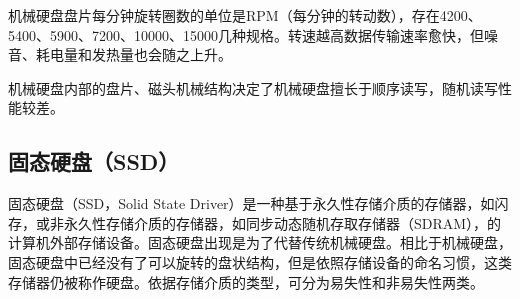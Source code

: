 机械硬盘盘片每分钟旋转圈数的单位是RPM（每分钟的转动数），存在4200、5400、5900、7200、10000、15000几种规格。转速越高数据传输速率愈快，但噪音、耗电量和发热量也会随之上升。

机械硬盘内部的盘片、磁头机械结构决定了机械硬盘擅长于顺序读写，随机读写性能较差。

\subsection{固态硬盘（SSD）}
固态硬盘\cite{ssd2009}（SSD，Solid State Driver）是一种基于永久性存储介质的存储器，如闪存，或非永久性存储介质的存储器，如同步动态随机存取存储器（SDRAM），的计算机外部存储设备。固态硬盘出现是为了代替传统机械硬盘。相比于机械硬盘，固态硬盘中已经没有了可以旋转的盘状结构，但是依照存储设备的命名习惯，这类存储器仍被称作硬盘。依据存储介质的类型，可分为易失性和非易失性两类。

